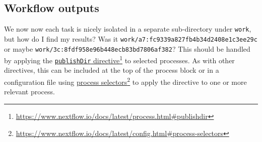 %
%
%
%
%
%


\subsection{Workflow outputs}

We now now each task is nicely isolated in a separate sub-directory under \texttt{work}, but how do I find my results? Was it \texttt{work/a7:fc9339a827fb4b34d2408e1c3ee29c} or maybe \texttt{work/3c:8fdf958e96b448ecb83bd7806af382}? This should be handled by applying the \href{https://www.nextflow.io/docs/latest/process.html#publishdir}{\texttt{publishDir} directive}\footnote{\url{https://www.nextflow.io/docs/latest/process.html\#publishdir}} to selected processes. As with other directives, this can be included at the top of the process block or in a configuration file using \href{https://www.nextflow.io/docs/latest/config.html#process-selectors}{process selectors}\footnote{\url{https://www.nextflow.io/docs/latest/config.html\#process-selectors}} to apply the directive to one or more relevant process. 


